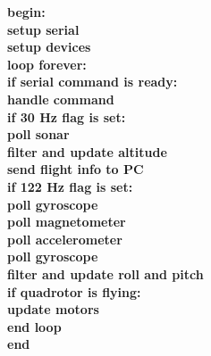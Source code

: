 {\bf
\tab begin:\\
\tab \tab setup serial\\
\tab \tab setup devices\\
\tab \tab loop forever:\\
\tab \tab \tab if serial command is ready:\\
\tab \tab \tab \tab handle command\\
\tab \tab \tab if 30 Hz flag is set:\\
\tab \tab \tab \tab poll sonar\\
\tab \tab \tab \tab filter and update altitude\\
\tab \tab \tab \tab send flight info to PC\\
\tab \tab \tab if 122 Hz flag is set:\\
\tab \tab \tab \tab poll gyroscope\\
\tab \tab \tab \tab poll magnetometer\\
\tab \tab \tab \tab poll accelerometer\\
\tab \tab \tab \tab poll gyroscope\\
\tab \tab \tab \tab filter and update roll and pitch\\
\tab \tab \tab \tab if quadrotor is flying:\\
\tab \tab \tab \tab \tab update motors\\
\tab \tab end loop\\
\tab end\\
}
